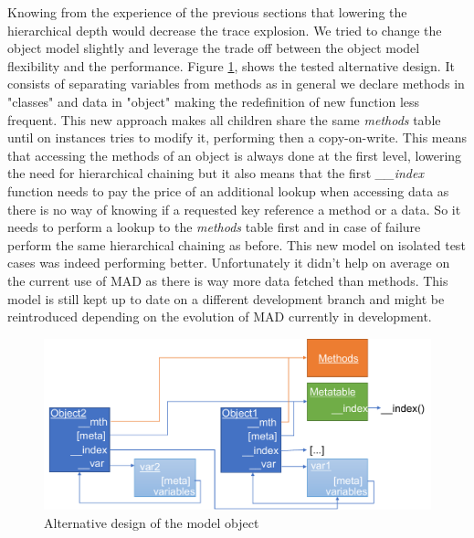 
Knowing from the experience of the previous sections that lowering the
hierarchical depth would decrease the trace explosion. We tried to change the
object model slightly and leverage the trade off between the object model
flexibility and the performance. Figure \ref{fig:MO-alt-desc}, shows the tested
alternative design. It consists of separating variables from methods as in
general we declare methods in "classes" and data in "object" making the
redefinition of new function less frequent. This new approach makes all children
share the same \emph{methods} table until on instances tries to modify it,
performing then a copy-on-write. This means that accessing the methods of an
object is always done at the first level, lowering the need for hierarchical
chaining but it also means that the first \emph{\_\_index} function needs to
pay the price of an additional lookup when accessing data as there is no way
of knowing if a requested key reference a method or a data. So it needs to perform
a lookup to the \emph{methods} table first and in case of failure perform the
same hierarchical chaining as before. This new model on isolated test cases was
indeed performing better. Unfortunately it didn't help on average on the current
use of MAD as there is way more data fetched than methods. This model is still
kept up to date on a different development branch and might be reintroduced
depending on the evolution of MAD currently in development.

\begin{figure}
    \centering
    \includegraphics[width=\textwidth]{./Images/MO2.pdf}
    \caption{Alternative design of the model object}
    \label{fig:MO-alt-desc}
\end{figure}
